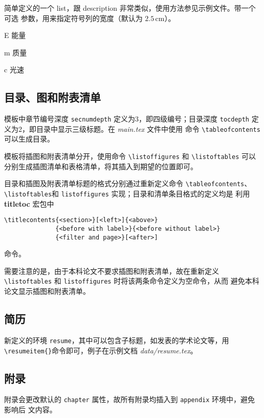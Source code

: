 简单定义的一个 list，跟 description 非常类似，使用方法参见示例文件。带一个可选
参数，用来指定符号列的宽度（默认为 $2.5\,\mathrm{cm}$）。
\begin{code}
\begin{denotation}[1.5cm]
  \item[E] 能量
  \item[m] 质量
  \item[c] 光速
\end{denotation}
\end{code}

\subsection*{目录、图和附表清单}

模板中章节编号深度 \texttt{secnumdepth} 定义为3，即四级编号；目录深度
\texttt{tocdepth} 定义为2，即目录中显示三级标题。在 \emph{main.tex} 文件中使用
命令 \verb|\tableofcontents|可以生成目录。

模板将插图和附表清单分开，使用命令 \verb|\listoffigures| 和 \verb|\listoftables|
可以分别生成插图清单和表格清单，将其插入到期望的位置即可。

目录和插图及附表清单标题的格式分别通过重新定义命令 \verb|\tableofcontents|、
\verb|\listoftables|和 \verb|listoffigures| 实现；目录和清单条目格式的定义均是
利用 \textbf{titletoc} 宏包中\\
\begin{verbatim}
\titlecontents{<section>}[<left>]{<above>}
              {<before with label>}{<before without label>}
              {<filter and page>}[<after>]
\end{verbatim}
命令。

需要注意的是，由于本科论文不要求插图和附表清单，故在重新定义
\verb|\listoftables| 和 \verb|listoffigures| 时将该两条命令定义为空命令，从而
避免本科论文显示插图和附表清单。

\subsection*{简历}

新定义的环境 \texttt{resume}，其中可以包含子标题，如发表的学术论文等，用
\verb|\resumeitem{}|命令即可，例子在示例文档 \emph{data/resume.tex}。

\subsection*{附录}

附录会更改默认的 \texttt{chapter} 属性，故所有附录均插入到 \texttt{appendix} 环境中，避免影响后
文内容。
\begin{code}
\begin{appendix}
 
 
\end{appendix}
\end{code}


